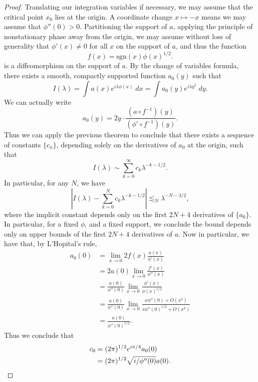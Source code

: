 \begin{proof}
    Translating our integration variables if necessary, we may assume that the critical point $x_0$ lies at the origin. A coordinate change $x \mapsto -x$ means we may assume that $\phi''(0) > 0$. Partitioning the support of $a$, applying the principle of nonstationary phase away from the origin, we may assume without loss of generality that $\phi'(x) \neq 0$ for all $x$ on the support of $a$, and thus the function
    \[ f(x) = \text{sgn}(x) \phi(x)^{1/2}. \]
    is a diffeomorphism on the support of $a$. By the change of variables formula, there exists a smooth, compactly supported function $a_0(y)$ such that
    \[ I(\lambda) = \int a(x) e^{i \lambda \phi(x)}\; dx = \int a_0(y) e^{i \lambda y^2}\; dy. \]
    We can actually write
    \[ a_0(y) = 2 y \cdot \frac{(a \circ f^{-1})(y)}{(\phi' \circ f^{-1})(y)}. \]
    Thus we can apply the previous theorem to conclude that there exists a sequence of constants $\{ c_n \}$, depending solely on the derivatives of $a_0$ at the origin, such that
    \[ I(\lambda) \sim \sum_{k = 0}^\infty c_k \lambda^{-k-1/2}. \]
    In particular, for any $N$, we have
    \[ | I(\lambda) - \sum_{k = 0}^N c_k \lambda^{-k-1/2} | \lesssim_N \lambda^{-N-3/2}, \]
    where the implicit constant depends only on the first $2N+4$ derivatives of $\{ a_0 \}$. In particular, for a fixed $\phi$, and a fixed support, we conclude the bound depends only on upper bounds of the first $2N+4$ derivatives of $a$. Now in particular, we have that, by L'Hopital's rule,
    \begin{align*}
        a_0(0) &= \lim_{x \to 0} 2 f(x) \frac{a(x)}{\phi'(x)}\\
        &= 2 a(0) \lim_{x \to 0} \frac{f'(x)}{\phi''(x)}\\
        &= \frac{a(0)}{\phi''(0)} \lim_{x \to 0} \frac{\phi'(x)}{\phi(x)^{1/2}}\\
        &= \frac{a(0)}{\phi''(0)} \lim_{x \to 0} \frac{x \phi''(0) + O(x^2)}{x \phi''(0)^{1/2} + O(x^2)}\\
        &= \frac{a(0)}{\phi''(0)^{1/2}}.
    \end{align*}
    Thus we conclude that
    \begin{align*}
        c_0 &= (2 \pi)^{1/2} e^{i \pi / 4} a_0(0)\\
        &= (2 \pi)^{1/2} \sqrt{ i / \phi''(0) } a(0). \qedhere
    \end{align*}
\end{proof}

